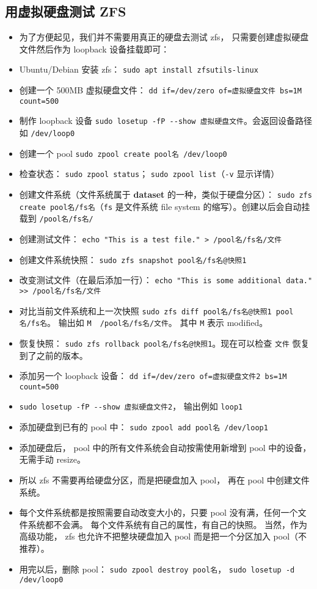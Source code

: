 \subsection{用虚拟硬盘测试 ZFS}\label{sub_ZFS_1}
\begin{itemize}
\item 为了方便起见，我们并不需要用真正的硬盘去测试 zfs， 只需要创建虚拟硬盘文件然后作为 loopback 设备挂载即可：
\item Ubuntu/Debian 安装 zfs： \verb|sudo apt install zfsutils-linux|
\item 创建一个 500MB 虚拟硬盘文件： \verb|dd if=/dev/zero of=虚拟硬盘文件 bs=1M count=500|
\item 制作 loopback 设备 \verb|sudo losetup -fP --show 虚拟硬盘文件|。会返回设备路径如 \verb|/dev/loop0|
\item 创建一个 pool \verb|sudo zpool create pool名 /dev/loop0|
\item 检查状态： \verb|sudo zpool status|； \verb|sudo zpool list|（\verb|-v| 显示详情）
\item 创建文件系统（文件系统属于 \textbf{dataset} 的一种，类似于硬盘分区）： \verb|sudo zfs create pool名/fs名|（\verb|fs| 是文件系统 file system 的缩写）。创建以后会自动挂载到 \verb`/pool名/fs名/`
\item 创建测试文件： \verb|echo "This is a test file." > /pool名/fs名/文件|
\item 创建文件系统快照： \verb|sudo zfs snapshot pool名/fs名@快照1|
\item 改变测试文件（在最后添加一行）： \verb|echo "This is some additional data." >> /pool名/fs名/文件|
\item 对比当前文件系统和上一次快照 \verb|sudo zfs diff pool名/fs名@快照1 pool名/fs名|。 输出如 \verb|M	/pool名/fs名/文件|。 其中 \verb|M| 表示 modified。
\item 恢复快照： \verb|sudo zfs rollback pool名/fs名@快照1|。现在可以检查 \verb|文件| 恢复到了之前的版本。
\item 添加另一个 loopback 设备： \verb|dd if=/dev/zero of=虚拟硬盘文件2 bs=1M count=500|
\item \verb|sudo losetup -fP --show 虚拟硬盘文件2|， 输出例如 \verb|loop1|
\item 添加硬盘到已有的 pool 中： \verb|sudo zpool add pool名 /dev/loop1|
\item 添加硬盘后， pool 中的所有文件系统会自动按需使用新增到 pool 中的设备，无需手动 resize。
\item 所以 zfs 不需要再给硬盘分区，而是把硬盘加入 pool， 再在 pool 中创建文件系统。
\item 每个文件系统都是按照需要自动改变大小的，只要 pool 没有满，任何一个文件系统都不会满。
每个文件系统有自己的属性，有自己的快照。 当然，作为高级功能， zfs 也允许不把整块硬盘加入 pool 而是把一个分区加入 pool（不推荐）。
\item 用完以后，删除 pool： \verb|sudo zpool destroy pool名|， \verb|sudo losetup -d /dev/loop0|
\end{itemize}

